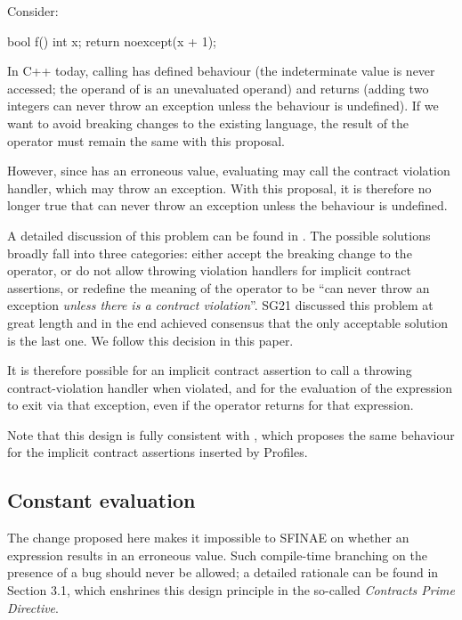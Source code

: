 Consider:
\begin{codeblock}
bool f() {
  int x;
  return noexcept(x + 1);
}
\end{codeblock}
In C++ today, calling  has defined behaviour (the indeterminate value is never accessed; the operand of  is an unevaluated operand) and returns  (adding two integers can never throw an exception unless the behaviour is undefined). If we want to avoid breaking changes to the existing language, the result of the  operator must remain the same with this proposal.

However, since  has an erroneous value, evaluating  may call the contract violation handler, which may throw an exception. With this proposal, it is therefore no longer true that  can never throw an exception unless the behaviour is undefined.

A detailed discussion of this problem can be found in \cite{P3541R1}. The possible solutions broadly fall into three categories: either accept the breaking change to the  operator, or do not allow throwing violation handlers for implicit contract assertions, or redefine the  meaning of the  operator to be ``can never throw an exception \emph{unless there is a contract violation}''. SG21 discussed this problem at great length and in the end achieved consensus that the only acceptable solution is the last one. We follow this decision in this paper.

It is therefore possible for an implicit contract assertion to call a throwing contract-violation handler when violated, and for the evaluation of the expression to exit via that exception, even if the  operator returns  for that expression.

Note that this design is fully consistent with \cite{P3081R1}, which proposes the same behaviour for the implicit contract assertions inserted by Profiles.

\subsection{Constant evaluation}

The change proposed here makes it impossible to SFINAE on whether an expression results in an erroneous value. Such compile-time branching on the presence of a bug should never be allowed; a detailed rationale can be found in \cite{P2900R13} Section 3.1, which enshrines this design principle in the so-called \emph{Contracts Prime Directive}.

